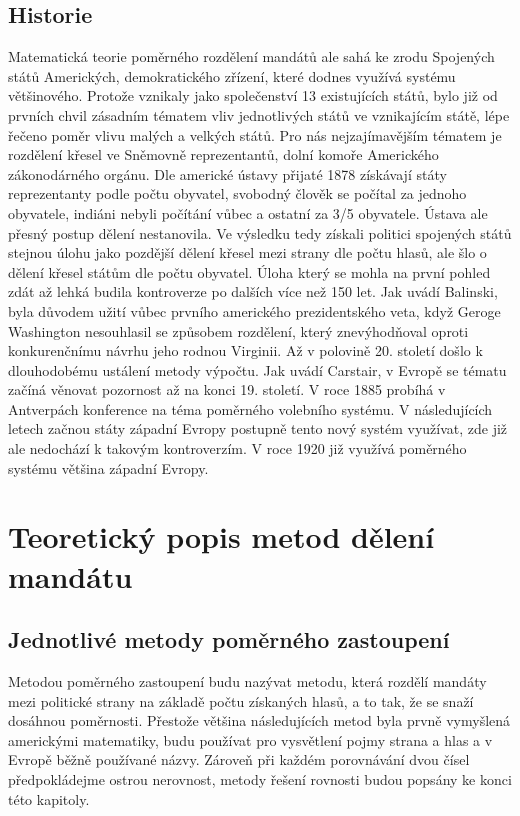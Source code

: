 \documentclass[12pt]{report}
\begin{document}
\section{Historie}
Matematická teorie poměrného rozdělení mandátů ale sahá ke zrodu Spojených států Amerických, demokratického zřízení, které dodnes využívá systému většinového.\autocite{BAL2} Protože vznikaly jako společenství 13 existujících států, bylo již od prvních chvil zásadním tématem vliv jednotlivých států ve vznikajícím státě, lépe řečeno poměr vlivu malých a velkých států.
Pro nás nejzajímavějším tématem je rozdělení křesel ve Sněmovně reprezentantů, dolní komoře Amerického zákonodárného orgánu.
Dle americké ústavy přijaté 1878 získávají státy reprezentanty podle počtu obyvatel, svobodný člověk se počítal za jednoho obyvatele, indiáni nebyli počítání vůbec a ostatní za 3/5 obyvatele.\autocite{CON} Ústava ale přesný postup dělení nestanovila.
Ve výsledku tedy získali politici spojených států stejnou úlohu jako pozdější dělení křesel mezi strany dle počtu hlasů, ale šlo o dělení křesel státům dle počtu obyvatel.
Úloha který se mohla na první pohled zdát až lehká budila kontroverze po dalších více než 150 let.
Jak uvádí Balinski, byla důvodem užití vůbec prvního amerického prezidentského veta, když Geroge Washington nesouhlasil se způsobem rozdělení, který znevýhodňoval oproti konkurenčnímu návrhu jeho rodnou Virginii.\autocite{BAL1}
Až v polovině 20.
století došlo k dlouhodobému ustálení metody výpočtu.
Jak uvádí Carstair, v Evropě se tématu začíná věnovat pozornost až na konci 19.
století.
V roce 1885 probíhá v Antverpách konference na téma poměrného volebního systému.
V následujících letech začnou státy západní Evropy postupně tento nový systém využívat, zde již ale nedochází k takovým kontroverzím.
V roce 1920 již využívá poměrného systému většina západní Evropy.\autocite{BOO} 
\chapter{Teoretický popis metod dělení mandátu}
\section{Jednotlivé metody poměrného zastoupení}
Metodou poměrného zastoupení budu nazývat metodu, která rozdělí mandáty mezi politické strany na základě počtu získaných hlasů, a to tak, že se snaží dosáhnou poměrnosti.
Přestože většina následujících metod byla prvně vymyšlená americkými matematiky, budu používat pro vysvětlení pojmy strana a hlas a v Evropě běžně používané názvy.
Zároveň při každém porovnávání dvou čísel předpokládejme ostrou nerovnost, metody řešení rovnosti budou popsány ke konci této kapitoly.
\end{document}
